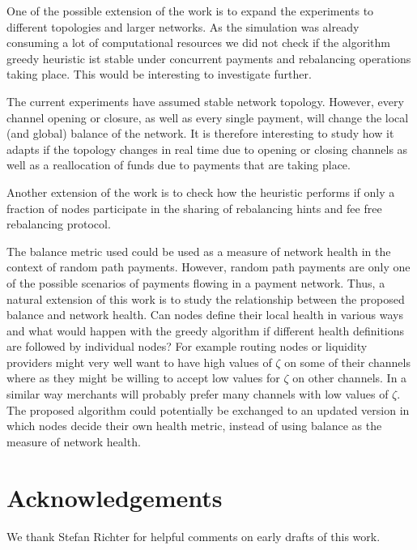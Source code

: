 \documentclass[a4paper]{paper}
\begin{document}
One of the possible extension of the work is to expand the experiments to different topologies and larger networks.
As the simulation was already consuming a lot of computational resources we did not check if the algorithm greedy heuristic ist stable under concurrent payments and rebalancing operations taking place. 
This would be interesting to investigate further.

The current experiments have assumed stable network topology. 
However, every channel opening or closure, as well as every single payment, will change the local (and global) balance of the network.
It is therefore interesting to study how it adapts if the topology changes in real time due to opening or closing channels as well as a reallocation of funds due to payments that are taking place. 

Another extension of the work is to check how the heuristic performs if only a fraction of nodes participate in the sharing of rebalancing hints and fee free rebalancing protocol.

The balance metric used could be used as a measure of network health in the context of random path payments. 
However, random path payments are only one of the possible scenarios of payments flowing in a payment network. 
Thus, a natural extension of this work is to 
study the relationship between the proposed balance and network health. Can nodes define their local health in various ways and what would happen with the greedy algorithm if different health definitions are followed by individual nodes?
For example routing nodes or liquidity providers might very well want to have high values of $\zeta$ on some of their channels where as they might be willing to accept low values for $\zeta$ on other channels.
In a similar way merchants will probably prefer many channels with low values of $\zeta$.
The proposed algorithm could potentially be exchanged to an updated version in which nodes decide their own health metric,
instead of using balance as the measure of network health.


\section{Acknowledgements}
\label{sec:ack}
We thank Stefan Richter for helpful comments on early drafts of this work.




\end{document}
